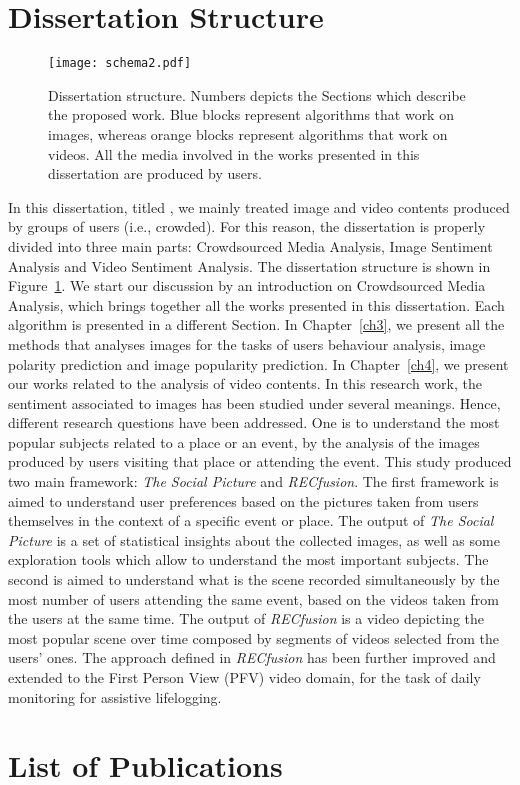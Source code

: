 \section{Dissertation Structure}
\begin{figure}[t]
	\centering
	\texttt{[image: schema2.pdf]}
	\caption{Dissertation structure. Numbers depicts the Sections which describe the proposed work. Blue blocks represent algorithms that work on images, whereas orange blocks represent algorithms that work on videos. All the media involved in the works presented in this dissertation are produced by users.
	}
	\label{figDissertationSchema}
\end{figure}
In this dissertation, titled , we mainly treated image and video contents produced by groups of users (i.e., crowded).
For this reason, the dissertation is properly divided into three main parts: Crowdsourced Media Analysis, Image Sentiment Analysis and Video Sentiment Analysis.
The dissertation structure is shown in Figure~\ref{figDissertationSchema}. We start our discussion by an introduction on Crowdsourced Media Analysis, which brings together all the works presented in this dissertation. Each algorithm is presented in a different Section. In Chapter~\ref{ch3}, we present all the methods that analyses images for the tasks of users behaviour analysis, image polarity prediction and image popularity prediction.
In Chapter~\ref{ch4}, we present our works related to the analysis of video contents.
In this research work, the sentiment associated to images has been studied under several meanings. Hence, different research questions have been addressed. 
One is to understand the most popular subjects related to a place or an event, by the analysis of the images produced by users visiting that place or attending the event. This study produced two main framework: \textit{The Social Picture} and \textit{RECfusion}. The first framework is aimed to understand user preferences based on the pictures taken from users themselves in the context of a specific event or place. The output of \textit{The Social Picture} is a set of statistical insights about the collected images, as well as some exploration tools which allow to understand the most important subjects. The second is aimed to understand what is the scene recorded simultaneously by the most number of users attending the same event, based on the videos taken from the users at the same time. The output of \textit{RECfusion} is a video depicting the most popular scene over time composed by segments of videos selected from the users' ones.
The approach defined in \textit{RECfusion} has been further improved and extended to the First Person View (PFV) video domain, for the task of daily monitoring for assistive lifelogging.



\section{List of Publications}
